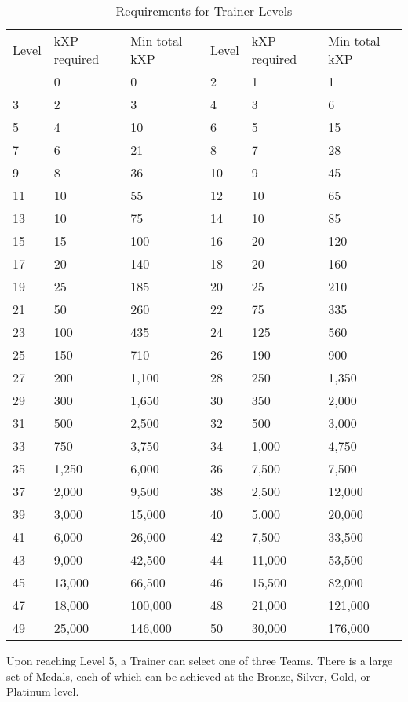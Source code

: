 \begin{table}
\begin{center}
\begin{tabular}{l l l l l l}
  Level & kXP required & Min total kXP & Level & kXP required & Min total kXP \\
\Midrule
  1 & 0 & 0 & 2 & 1 & 1 \\
  3 & 2 & 3 & 4 & 3 & 6 \\
  5 & 4 & 10 & 6 & 5 & 15 \\
  7 & 6 & 21 & 8 & 7 & 28 \\
  9 & 8 & 36 & 10 & 9 & 45 \\
 11 & 10 & 55 & 12 & 10 & 65 \\
 13 & 10 & 75 & 14 & 10 & 85 \\
 15 & 15 & 100 & 16 & 20 & 120 \\
 17 & 20 & 140 & 18 & 20 & 160 \\
 19 & 25 & 185 & 20 & 25 & 210 \\
 21 & 50 & 260 & 22 & 75 & 335 \\
 23 & 100 & 435 & 24 & 125 & 560 \\
 25 & 150 & 710 & 26 & 190 & 900 \\
 27 & 200 & 1,100 & 28 & 250 & 1,350 \\
 29 & 300 & 1,650 & 30 & 350 & 2,000 \\
 31 & 500 & 2,500 & 32 & 500 & 3,000 \\
 33 & 750 & 3,750 & 34 & 1,000 & 4,750 \\
 35 & 1,250 & 6,000 & 36 & 7,500 & 7,500 \\
 37 & 2,000 & 9,500 & 38 & 2,500 & 12,000 \\
 39 & 3,000 & 15,000 & 40 & 5,000 & 20,000 \\
 41 & 6,000 & 26,000 & 42 & 7,500 & 33,500 \\
 43 & 9,000 & 42,500 & 44 & 11,000 & 53,500 \\
 45 & 13,000 & 66,500 & 46 & 15,500 & 82,000 \\
 47 & 18,000 & 100,000 & 48 & 21,000 & 121,000 \\
 49 & 25,000 & 146,000 & 50 & 30,000 & 176,000 \\
\end{tabular}
\caption{Requirements for Trainer Levels}
\end{center}
\end{table}

Upon reaching Level 5, a Trainer can select one of three Teams.
There is a large set of Medals, each of which can be achieved at the Bronze,
 Silver, Gold, or Platinum level.


